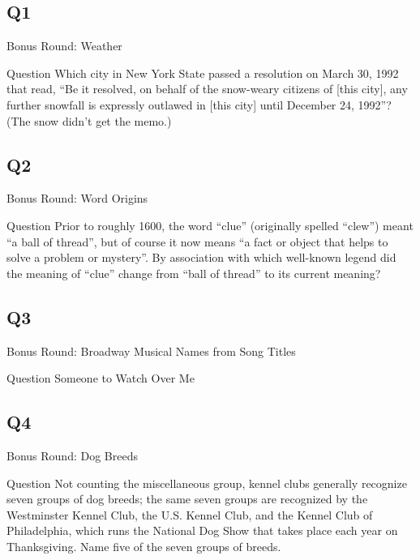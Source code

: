 \documentclass[11pt]{beamer}
\begin{document}
\subsection*{Q1}
\begin{frame}[t]{Bonus Round: Weather}
\begin{block}{Question}
Which city in New York State passed a resolution on March 30, 1992 that read, ``Be it resolved, on behalf of the snow-weary citizens of [this city], any further snowfall is expressly outlawed in [this city] until December 24, 1992''? (The snow didn't get the memo.)
\end{block}
\end{frame}
\subsection*{Q2}
\begin{frame}[t]{Bonus Round: Word Origins}
\begin{block}{Question}
Prior to roughly 1600, the word ``clue'' (originally spelled ``clew'') meant ``a ball of thread'', but of course it now means ``a fact or object that helps to solve a problem or mystery''. By association with which well-known legend did the meaning of ``clue'' change from ``ball of thread'' to its current meaning?
\end{block}
\end{frame}
\subsection*{Q3}
\begin{frame}[t]{Bonus Round: Broadway Musical Names from Song Titles}
\begin{block}{Question}
Someone to Watch Over Me
\end{block}
\end{frame}
\subsection*{Q4}
\begin{frame}[t]{Bonus Round: Dog Breeds}
\begin{block}{Question}
Not counting the miscellaneous group, kennel clubs generally recognize seven groups of dog breeds; the same seven groups are recognized by the Westminster Kennel Club, the U.S. Kennel Club, and the Kennel Club of Philadelphia, which runs the National Dog Show that takes place each year on Thanksgiving. Name five of the seven groups of breeds.
\end{block}
\end{frame}
\end{document}
